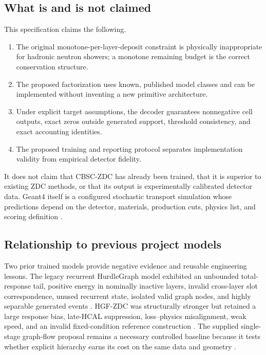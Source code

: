 \documentclass[11pt]{article}
\theoremstyle{definition}
\theoremstyle{remark}
\begin{document}
\subsection{What is and is not claimed}
This specification claims the following.
\begin{enumerate}[label=\textbf{C\arabic*.},leftmargin=2.2em]
  \item The original monotone-per-layer-deposit constraint is physically inappropriate for hadronic neutron showers; a monotone remaining budget is the correct conservation structure.
  \item The proposed factorization uses known, published model classes and can be implemented without inventing a new primitive architecture.
  \item Under explicit target assumptions, the decoder guarantees nonnegative cell outputs, exact zeros outside generated support, threshold consistency, and exact accounting identities.
  \item The proposed training and reporting protocol separates implementation validity from empirical detector fidelity.
\end{enumerate}
It does not claim that CBSC-ZDC has already been trained, that it is superior to existing ZDC methods, or that its output is experimentally calibrated detector data. Geant4 itself is a configured stochastic transport simulation whose predictions depend on the detector, materials, production cuts, physics list, and scoring definition \citep{geant4_2003,geant4_2006,geant4_2016,geant4_hadronic_manual}.

\subsection{Relationship to previous project models}
Two prior trained models provide negative evidence and reusable engineering lessons. The legacy recurrent HurdleGraph model exhibited an unbounded total-response tail, positive energy in nominally inactive layers, invalid cross-layer slot correspondence, unused recurrent state, isolated valid graph nodes, and highly separable generated events \citep{project_legacy_audit}. HGF-ZDC was structurally stronger but retained a large response bias, late-HCAL suppression, loss--physics misalignment, weak speed, and an invalid fixed-condition reference construction \citep{project_hgf_audit}. The supplied single-stage graph-flow proposal remains a necessary controlled baseline because it tests whether explicit hierarchy earns its cost on the same data and geometry \citep{project_single_stage}.
\end{document}
